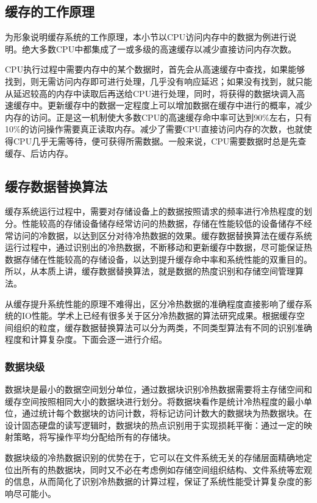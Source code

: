 \subsection{缓存的工作原理}
为形象说明缓存系统的工作原理，本小节以CPU访问内存中的数据为例进行说明。绝大多数CPU中都集成了一或多级的高速缓存以减少直接访问内存次数。

CPU执行过程中需要内存中的某个数据时，首先会从高速缓存中查找，如果能够找到，则无需访问内存即可进行处理，几乎没有响应延迟；如果没有找到，就只能从延迟较高的内存中读取后再送给CPU进行处理，同时，将获得的数据块调入高速缓存中。更新缓存中的数据一定程度上可以增加数据在缓存中进行的概率，减少内存的访问。正是这一机制使大多数CPU的高速缓存命中率可达到90\%左右，只有10\%的访问操作需要真正读取内存。减少了需要CPU直接访问内存的次数，也就使得CPU几乎无需等待，便可获得所需数据。一般来说，CPU需要数据时总是先查缓存、后访内存。

\subsection{缓存数据替换算法}
缓存系统运行过程中，需要对存储设备上的数据按照请求的频率进行冷热程度的划分。性能较高的存储设备储存经常访问的热数据，存储在性能较低的设备储存不经常访问的冷数据，以达到区分对待冷热数据的效果。缓存数据替换算法在缓存系统运行过程中，通过识别出的冷热数据，不断移动和更新缓存中数据，尽可能保证热数据存储在性能较高的存储设备，以达到提升缓存命中率和系统性能的双重目的。所以，从本质上讲，缓存数据替换算法，就是数据的热度识别和存储空间管理算法。

从缓存提升系统性能的原理不难得出，区分冷热数据的准确程度直接影响了缓存系统的IO性能。学术上已经有很多关于区分冷热数据的算法研究成果。根据缓存空间组织的粒度，缓存数据替换算法可以分为两类，不同类型算法有不同的识别准确程度和计算复杂度。下面会逐一进行介绍。

\subsubsection{数据块级}

数据块是最小的数据空间划分单位，通过数据块识别冷热数据需要将主存储空间和缓存空间按照相同大小的数据块进行划分。将数据块看作是统计冷热程度的最小单位，通过统计每个数据块的访问计数，将标记访问计数大的数据块为热数据块。在设计固态硬盘的读写逻辑时，数据块的热点识别用于实现损耗平衡：通过一定的映射策略，将写操作平均分配给所有的存储块。

数据块级的冷热数据识别的优势在于，它可以在文件系统无关的存储层面精确地定位出所有的热数据块，同时又不必在考虑例如存储空间组织结构、文件系统等宏观的信息，从而简化了识别冷热数据的计算过程，保证了系统性能受计算复杂度的影响尽可能小。

